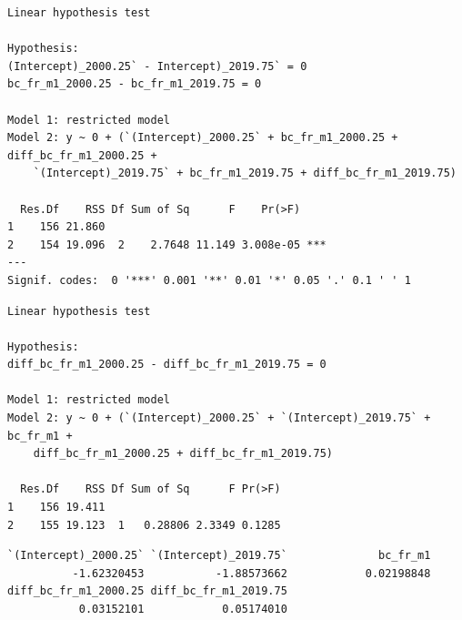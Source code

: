 \documentclass[
  a4paper,
  DIV=11,
  numbers=noendperiod,
  french]{scrartcl}
\newenvironment{Shaded}{\begin{snugshade}}{\end{snugshade}}
\newcommand{\AttributeTok}[1]{\textcolor[rgb]{0.40,0.45,0.13}{#1}}
\newcommand{\DecValTok}[1]{\textcolor[rgb]{0.68,0.00,0.00}{#1}}
\newcommand{\FunctionTok}[1]{\textcolor[rgb]{0.28,0.35,0.67}{#1}}
\newcommand{\NormalTok}[1]{\textcolor[rgb]{0.00,0.23,0.31}{#1}}
\newcommand{\OtherTok}[1]{\textcolor[rgb]{0.00,0.23,0.31}{#1}}
\newcommand{\SpecialCharTok}[1]{\textcolor[rgb]{0.37,0.37,0.37}{#1}}
\newcommand{\StringTok}[1]{\textcolor[rgb]{0.13,0.47,0.30}{#1}}
\newcommand\1{{\mathds 1}}
\theoremstyle{remark}
\begin{document}
\begin{verbatim}
Linear hypothesis test

Hypothesis:
(Intercept)_2000.25` - Intercept)_2019.75` = 0
bc_fr_m1_2000.25 - bc_fr_m1_2019.75 = 0

Model 1: restricted model
Model 2: y ~ 0 + (`(Intercept)_2000.25` + bc_fr_m1_2000.25 + diff_bc_fr_m1_2000.25 + 
    `(Intercept)_2019.75` + bc_fr_m1_2019.75 + diff_bc_fr_m1_2019.75)

  Res.Df    RSS Df Sum of Sq      F    Pr(>F)    
1    156 21.860                                  
2    154 19.096  2    2.7648 11.149 3.008e-05 ***
---
Signif. codes:  0 '***' 0.001 '**' 0.01 '*' 0.05 '.' 0.1 ' ' 1
\end{verbatim}

\begin{Shaded}
\end{Shaded}

\begin{verbatim}
Linear hypothesis test

Hypothesis:
diff_bc_fr_m1_2000.25 - diff_bc_fr_m1_2019.75 = 0

Model 1: restricted model
Model 2: y ~ 0 + (`(Intercept)_2000.25` + `(Intercept)_2019.75` + bc_fr_m1 + 
    diff_bc_fr_m1_2000.25 + diff_bc_fr_m1_2019.75)

  Res.Df    RSS Df Sum of Sq      F Pr(>F)
1    156 19.411                           
2    155 19.123  1   0.28806 2.3349 0.1285
\end{verbatim}

\begin{Shaded}
\end{Shaded}

\begin{verbatim}
`(Intercept)_2000.25` `(Intercept)_2019.75`              bc_fr_m1 
          -1.62320453           -1.88573662            0.02198848 
diff_bc_fr_m1_2000.25 diff_bc_fr_m1_2019.75 
           0.03152101            0.05174010 
\end{verbatim}
\end{document}
